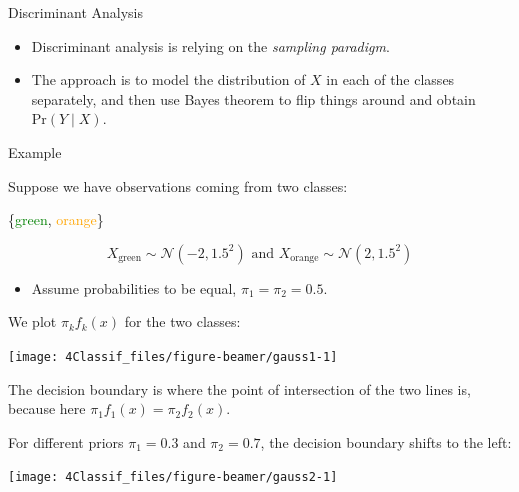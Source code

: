 \documentclass[10pt,ignorenonframetext,]{beamer}
\providecommand{\tightlist}{%
  \setlength{\itemsep}{0pt}\setlength{\parskip}{0pt}}
\begin{document}
\begin{frame}{Discriminant Analysis}

\vspace{2mm}

\begin{itemize}
\item
  Discriminant analysis is relying on the \emph{sampling paradigm}.
\item
  The approach is to model the distribution of \(X\) in each of the
  classes separately, and then use Bayes theorem to flip things around
  and obtain \(\text{Pr}(Y \mid X)\).
\end{itemize}

\begin{block}{Example}

\vspace{2mm}

Suppose we have observations coming from two classes:

\{\textcolor{green}{green}, \textcolor{orange}{orange}\}

\[X_{\text{green}}\sim \mathcal{N}(-2, 1.5^2) \text{ and }
X_{\text{orange}}\sim \mathcal{N}(2, 1.5^2) \]

\begin{itemize}
\tightlist
\item
  Assume probabilities to be equal, \(\pi_1 = \pi_2 = 0.5\).
\end{itemize}

\end{block}

\end{frame}

\begin{frame}

We plot \(\pi_k f_k(x)\) for the two classes:

\begin{center}\texttt{[image: 4Classif\_files/figure-beamer/gauss1-1]} \end{center}

The decision boundary is where the point of intersection of the two
lines is, because here \(\pi_1 f_1(x)=\pi_2 f_2(x)\).

\end{frame}

\begin{frame}

For different priors \(\pi_1 = 0.3\) and \(\pi_2 = 0.7\), the decision
boundary shifts to the left:

\begin{center}\texttt{[image: 4Classif\_files/figure-beamer/gauss2-1]} \end{center}

\end{frame}
\end{document}
